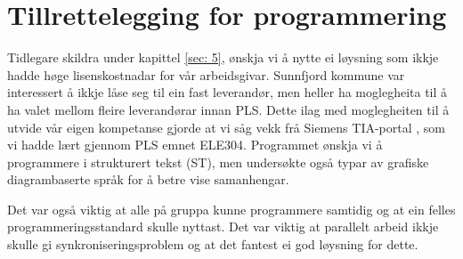 \chapter{Tillrettelegging for programmering}
\thispagestyle{fancy}
\label{sec:7} 

Tidlegare skildra under kapittel \ref{sec: 5}, ønskja vi å nytte ei løysning som ikkje hadde høge lisenskostnadar for vår arbeidsgivar. 
Sunnfjord kommune var interessert å ikkje låse seg til ein fast leverandør, men heller ha moglegheita til å ha valet mellom fleire 
leverandørar innan \gls{PLS}. Dette ilag med moglegheiten til å utvide vår eigen kompetanse 
gjorde at vi såg vekk frå Siemens \gls{TIA}-portal \citep{Siemens}, som vi hadde lært gjennom \gls{PLS} emnet ELE304.
Programmet ønskja vi å programmere i strukturert tekst (\gls{ST}), men undersøkte også 
typar av grafiske diagrambaserte språk for å betre vise samanhengar.

Det var også viktig at alle på gruppa kunne programmere samtidig og at ein felles programmeringsstandard skulle nyttast.
Det var viktig at parallelt arbeid ikkje skulle gi synkroniseringsproblem og at det fantest ei god løysning for dette.

